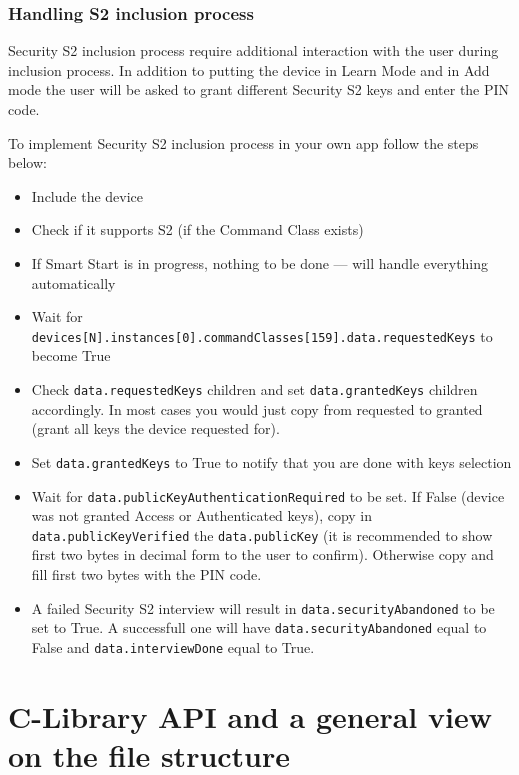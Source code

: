 \subsubsection{Handling S2 inclusion process}

Security S2 inclusion process require additional interaction with the user
during inclusion process. In addition to putting the device in Learn Mode
and \zway in Add mode the user will be asked to grant different Security S2 keys
and enter the PIN code.

To implement Security S2 inclusion process in your own app follow the steps
below:
\begin {itemize}
\item Include the device
\item Check if it supports S2 (if the Command Class exists)
\item If Smart Start is in progress, nothing to be done --- \zway will handle
everything automatically
\item Wait for {\small{\texttt{devices[N].instances[0].commandClasses[159].data.requestedKeys}}} to become True
\item Check {\small{\texttt{data.requestedKeys}}} children and set {\small{\texttt{data.grantedKeys}}} children accordingly. In most cases you would just copy from requested to granted
(grant all keys the device requested for).
\item Set {\small{\texttt{data.grantedKeys}}} to True to notify \zway that you are done with keys selection
\item Wait for {\small{\texttt{data.publicKeyAuthenticationRequired}}} to be set. If False (device was not granted Access or Authenticated keys), copy in
{\small{\texttt{data.publicKeyVerified}}} the {\small{\texttt{data.publicKey}}} (it is recommended to show first two bytes in decimal form to the user to confirm). Otherwise copy and fill first two bytes with the PIN code.
\item A failed Security S2 interview will result in {\small{\texttt{data.securityAbandoned}}} to be
set to True. A successfull one will have {\small{\texttt{data.securityAbandoned}}}
equal to False and {\small{\texttt{data.interviewDone}}} equal to True.
\end{itemize}


\section{C-Library API and a general view on the \zway file structure}
\label{clevelapi}

